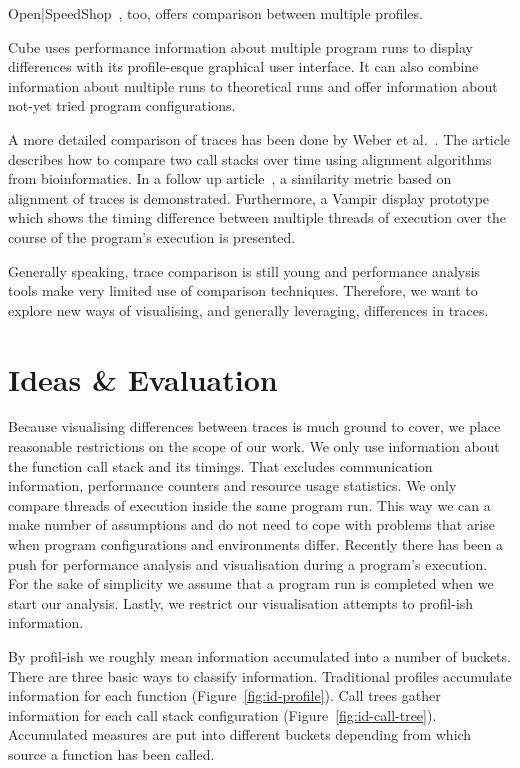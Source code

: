 \documentclass[b5paper, final, hauptseminar]{zih-template}
\newcommand*\cleartooddpage{
	\clearpage
	\ifthenelse{\isodd{\thepage}}
		{}
		{\newpage \mbox{} \clearpage}
}
\begin{document}
Open|SpeedShop~\cite{schulz08}, too, offers comparison between multiple profiles.

Cube uses performance information about multiple program runs to display differences with its profile-esque graphical user interface. It can also combine information about multiple runs to theoretical runs and offer information about not-yet tried program configurations.

A more detailed comparison of traces has been done by Weber et al.~\cite{weber12}.
The article describes how to compare two call stacks over time using alignment algorithms from bioinformatics.
In a follow up article~\cite{weber13}, a similarity metric based on alignment of traces is demonstrated.
Furthermore, a Vampir display prototype which shows the timing difference between multiple threads of execution over the course of the program's execution is presented.

Generally speaking, trace comparison is still young and performance analysis tools make very limited use of comparison techniques.
Therefore, we want to explore new ways of visualising, and generally leveraging, differences in traces.

\cleartooddpage
\section{Ideas \& Evaluation}
Because visualising differences between traces is much ground to cover, we place reasonable restrictions on the scope of our work.
We only use information about the function call stack and its timings. That excludes communication information, performance counters and resource usage statistics.
We only compare threads of execution inside the same program run.
This way we can a make number of assumptions and do not need to cope with problems that arise when program configurations and environments differ.
Recently there has been a push for performance analysis and visualisation during a program's execution. For the sake of simplicity we assume that a program run is completed when we start our analysis.
Lastly, we restrict our visualisation attempts to profil-ish information.

By profil-ish we roughly mean information accumulated into a number of buckets.
There are three basic ways to classify information.
Traditional profiles accumulate information for each function (Figure~\ref{fig:id-profile}).
Call trees gather information for each call stack configuration (Figure~\ref{fig:id-call-tree}).
Accumulated measures are put into different buckets depending from which source a function has been called.
\end{document}
